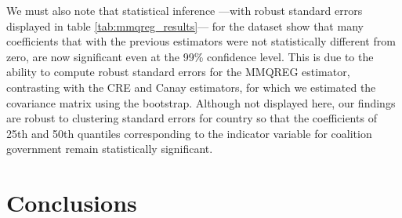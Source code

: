 \documentclass{article}
\begin{document}
We must also note that statistical inference ---with robust standard errors displayed in table \ref{tab:mmqreg_results}--- for the \cite{persson2007} dataset show that many coefficients that with the previous estimators were not statistically different from zero, are now significant even at the 99\% confidence level. This is due to the ability to compute robust standard errors for the MMQREG estimator, contrasting with the CRE and Canay estimators, for which we estimated the covariance matrix using the bootstrap. Although not displayed here, our findings are robust to clustering standard errors for country so that the coefficients of 25th and 50th quantiles corresponding to the indicator variable for coalition government remain statistically significant.


\section{Conclusions}\label{sec:conclusions}




\end{document}
